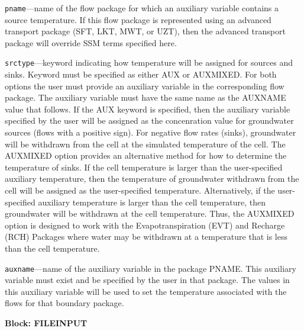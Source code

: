 \begin{description}
\item \texttt{pname}---name of the flow package for which an auxiliary variable contains a source temperature.  If this flow package is represented using an advanced transport package (SFT, LKT, MWT, or UZT), then the advanced transport package will override SSM terms specified here.

\item \texttt{srctype}---keyword indicating how temperature will be assigned for sources and sinks.  Keyword must be specified as either AUX or AUXMIXED.  For both options the user must provide an auxiliary variable in the corresponding flow package.  The auxiliary variable must have the same name as the AUXNAME value that follows.  If the AUX keyword is specified, then the auxiliary variable specified by the user will be assigned as the concenration value for groundwater sources (flows with a positive sign).  For negative flow rates (sinks), groundwater will be withdrawn from the cell at the simulated temperature of the cell.  The AUXMIXED option provides an alternative method for how to determine the temperature of sinks.  If the cell temperature is larger than the user-specified auxiliary temperature, then the temperature of groundwater withdrawn from the cell will be assigned as the user-specified temperature.  Alternatively, if the user-specified auxiliary temperature is larger than the cell temperature, then groundwater will be withdrawn at the cell temperature.  Thus, the AUXMIXED option is designed to work with the Evapotranspiration (EVT) and Recharge (RCH) Packages where water may be withdrawn at a temperature that is less than the cell temperature.

\item \texttt{auxname}---name of the auxiliary variable in the package PNAME.  This auxiliary variable must exist and be specified by the user in that package.  The values in this auxiliary variable will be used to set the temperature associated with the flows for that boundary package.

\end{description}
\item \textbf{Block: FILEINPUT}

